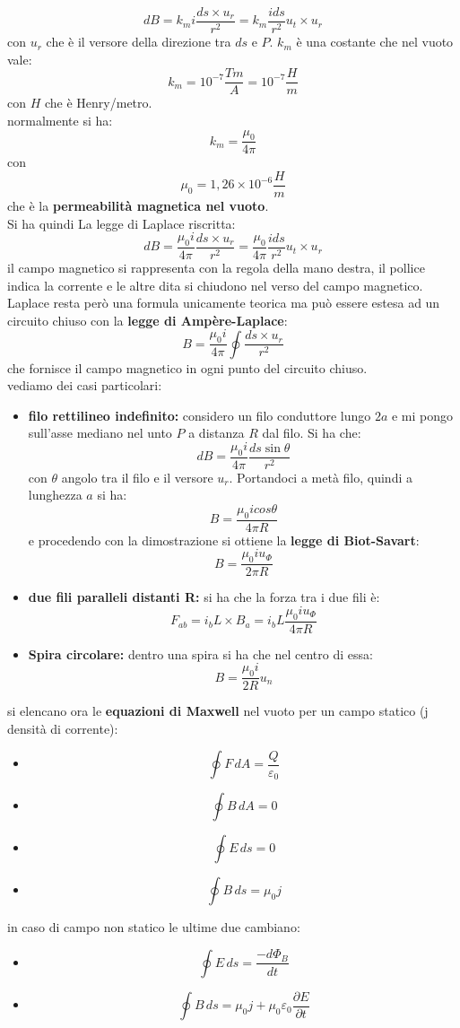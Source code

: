 \documentclass[a4paper,12pt, oneside]{book}
\begin{document}
$$dB=k_mi\frac{ds\times u_r}{r^2}=k_m\frac{ids}{r^2}u_t\times u_r$$
con $u_r$ che è il versore della direzione tra $ds$ e $P$. $k_m$ è una costante che nel vuoto vale:
$$k_m=10^{-7}\frac{Tm}{A}=10^{-7}\frac{H}{m}$$
con $H$ che è Henry/metro.\\
normalmente si ha:
$$k_m=\frac{\mu_0}{4\pi}$$
con
$$\mu_0=1,26\times 10^{-6}\frac{H}{m}$$
che è la \textbf{permeabilità magnetica nel vuoto}.\\
Si ha quindi La legge di Laplace riscritta:
$$dB=\frac{\mu_0i}{4\pi}\frac{ds\times u_r}{r^2}=\frac{\mu_0}{4\pi}\frac{ids}{r^2}u_t\times u_r$$
il campo magnetico si rappresenta con la regola della mano destra, il pollice indica la corrente e le altre dita si chiudono nel verso del campo magnetico.\\ Laplace resta però una formula unicamente teorica ma può essere estesa ad un circuito chiuso con la \textbf{legge di Ampère-Laplace}:
$$B=\frac{\mu_0i}{4\pi}\oint\frac{ds\times u_r}{r^2}$$
che fornisce il campo magnetico in ogni punto del circuito chiuso.\\
vediamo dei casi particolari:
\begin{itemize}
\item \textbf{filo rettilineo indefinito:} considero un filo conduttore lungo $2a$ e mi pongo sull'asse mediano nel unto $P$ a distanza $R$ dal filo. Si ha che:
$$dB=\frac{\mu_0i}{4\pi}\frac{ds\sin\theta}{r^2}$$
con $\theta$ angolo tra il filo e il versore $u_r$. Portandoci a metà filo, quindi a lunghezza $a$ si ha:
$$B=\frac{\mu_0icos\theta}{4\pi R}$$
e procedendo con la dimostrazione si ottiene la \textbf{legge di Biot-Savart}:
$$B=\frac{\mu_0 iu_\Phi}{2\pi R}$$
\item \textbf{due fili paralleli distanti R:} si ha che la forza tra i due fili è:
$$F_{ab}=i_bL\times B_a=i_bL\frac{\mu_0iu_\Phi}{4\pi R}$$
\item \textbf{Spira circolare:} dentro una spira si ha che nel centro di essa:
$$B=\frac{\mu_0i}{2 R}u_n$$
\end{itemize}
si elencano ora le \textbf{equazioni di Maxwell} nel vuoto per un campo statico (j densità di corrente):
\begin{itemize}
\item $$\oint F\,dA=\frac{Q}{\varepsilon_0}$$
\item  $$\oint B\,dA=0$$
\item  $$\oint E\,ds=0$$
\item  $$\oint B\,ds=\mu_0 j$$
\end{itemize}
in caso di campo non statico le ultime due cambiano:
\begin{itemize}
\item  $$\oint E\,ds=\frac{-d\Phi_B}{dt}$$
\item  $$\oint B\,ds=\mu_0 j+\mu_0\varepsilon_0\frac{\partial E}{\partial t}$$
\end{itemize}
\end{document}
